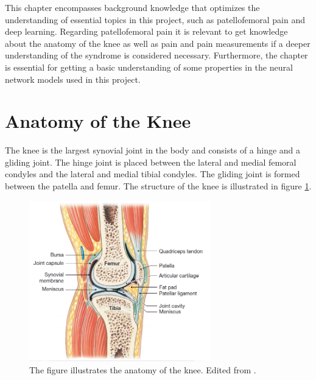 

This chapter encompasses background knowledge that optimizes the understanding of essential topics in this project, such as patellofemoral pain and deep learning. Regarding patellofemoral pain it is relevant to get knowledge about the anatomy of the knee as well as pain and pain measurements if a deeper understanding of the syndrome is considered necessary.  Furthermore, the chapter is essential for getting a basic understanding of some properties in the neural network models used in this project.


\section{Anatomy of the Knee}
The knee is the largest synovial joint in the body and consists of a hinge and a gliding joint. The hinge joint is placed between the lateral and medial femoral condyles and the lateral and medial tibial condyles. The gliding joint is formed between the patella and femur. The structure of the knee is illustrated in figure \ref{fig:bonestruc}.\citep{Martini2012}

\begin{figure} [H]
\centering
\includegraphics[width=0.7\textwidth]{figures/bonestruc}
\caption{The figure illustrates the anatomy of the knee. Edited from \citep{Martini2012}.}
\label{fig:bonestruc}
\end{figure}

